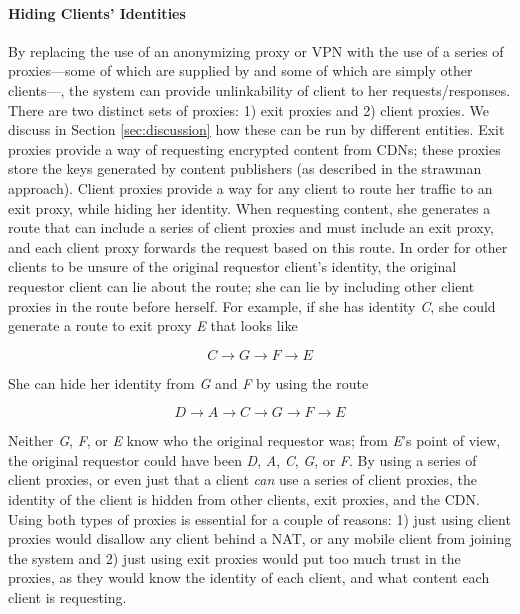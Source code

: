 \paragraph{Hiding Clients' Identities} By replacing the use of an anonymizing proxy or VPN with the use of 
a series of proxies---some of which are supplied by \system{} and some of which are simply other clients---, 
the system can provide unlinkability of client to her requests/responses. There are two distinct sets of 
proxies: 1) exit proxies and 2) client proxies.  We discuss in Section \ref{sec:discussion} how these can be run by different 
entities.  Exit proxies provide a way of requesting encrypted content from CDNs; these proxies store the keys generated 
by content publishers (as described in the strawman approach).  Client proxies provide 
a way for any client to route her traffic to an exit proxy, while hiding her identity.  When requesting content, she 
generates a route that can include a series of client proxies and must include an exit proxy, and each client proxy 
forwards the request based on this route.  In order for other clients to be unsure of the original requestor client's 
identity, the original requestor client can lie about the route; she can lie by including other client proxies 
in the route before herself.  For example, if she has identity {\it C}, she could generate a route to exit proxy {\it E} that 
looks like 

\[C \rightarrow G \rightarrow F \rightarrow E\] 

\noindent She can hide her identity from {\it G} and {\it F} by using the route 

\[D \rightarrow A \rightarrow C \rightarrow G \rightarrow F \rightarrow E\]  

\noindent Neither {\it G}, {\it F}, or {\it E} know who the original requestor was; from {\it E}'s point of 
view, the original requestor could have been {\it D}, {\it A}, {\it C}, {\it G}, or {\it F}.  By using a series of 
client proxies, or even just that a client {\it can} use a series of client proxies, the identity of the client is 
hidden from other clients, exit proxies, and the CDN.  Using both types of proxies is essential for a couple of 
reasons: 1) just using client proxies would disallow any client behind a NAT, or any mobile client from joining 
the system and 2) just using exit proxies would put too much trust in the proxies, as they would know the identity 
of each client, and what content each client is requesting.


